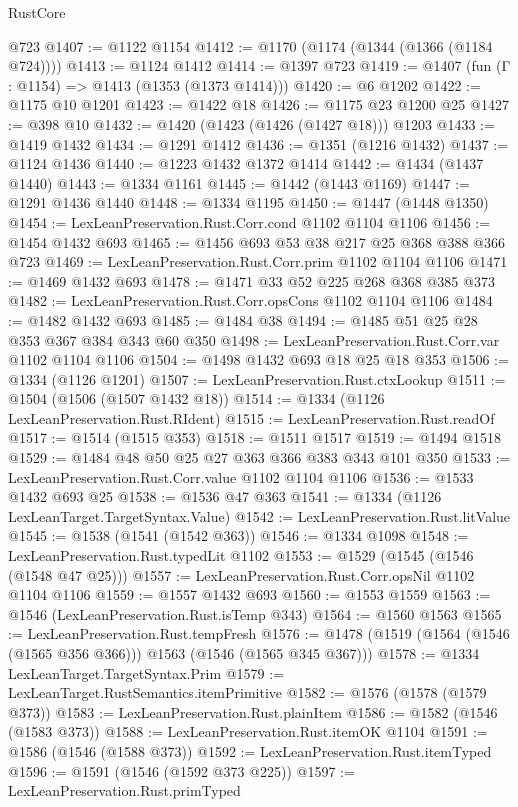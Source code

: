 \begin{lexlean}{RustCore}
\begin{coremodule}
    @723
@1407 := @1122 @1154
@1412 := @1170 (@1174 (@1344 (@1366 (@1184 @724))))
@1413 := @1124 @1412
@1414 := @1397 @723
@1419 := @1407 (fun (Γ : @1154) => @1413 (@1353 (@1373 @1414)))
@1420 := @6 @1202
@1422 := @1175 @10 @1201
@1423 := @1422 @18
@1426 := @1175 @23 @1200 @25
@1427 := @398 @10
@1432 := @1420 (@1423 (@1426 (@1427 @18))) @1203
@1433 := @1419 @1432
@1434 := @1291 @1412
@1436 := @1351 (@1216 @1432)
@1437 := @1124 @1436
@1440 := @1223 @1432 @1372 @1414
@1442 := @1434 (@1437 @1440)
@1443 := @1334 @1161
@1445 := @1442 (@1443 @1169)
@1447 := @1291 @1436 @1440
@1448 := @1334 @1195
@1450 := @1447 (@1448 @1350)
@1454 := LexLeanPreservation.Rust.Corr.cond @1102 @1104 @1106
@1456 := @1454 @1432 @693
@1465 := @1456 @693 @53 @38 @217 @25 @368 @388 @366 @723
@1469 := LexLeanPreservation.Rust.Corr.prim @1102 @1104 @1106
@1471 := @1469 @1432 @693
@1478 := @1471 @33 @52 @225 @268 @368 @385 @373
@1482 := LexLeanPreservation.Rust.Corr.opsCons @1102 @1104 @1106
@1484 := @1482 @1432 @693
@1485 := @1484 @38
@1494 := @1485 @51 @25 @28 @353 @367 @384 @343 @60 @350
@1498 := LexLeanPreservation.Rust.Corr.var @1102 @1104 @1106
@1504 := @1498 @1432 @693 @18 @25 @18 @353
@1506 := @1334 (@1126 @1201)
@1507 := LexLeanPreservation.Rust.ctxLookup
@1511 := @1504 (@1506 (@1507 @1432 @18))
@1514 := @1334 (@1126 LexLeanPreservation.Rust.RIdent)
@1515 := LexLeanPreservation.Rust.readOf
@1517 := @1514 (@1515 @353)
@1518 := @1511 @1517
@1519 := @1494 @1518
@1529 := @1484 @48 @50 @25 @27 @363 @366 @383 @343 @101 @350
@1533 := LexLeanPreservation.Rust.Corr.value @1102 @1104 @1106
@1536 := @1533 @1432 @693 @25
@1538 := @1536 @47 @363
@1541 := @1334 (@1126 LexLeanTarget.TargetSyntax.Value)
@1542 := LexLeanPreservation.Rust.litValue
@1545 := @1538 (@1541 (@1542 @363))
@1546 := @1334 @1098
@1548 := LexLeanPreservation.Rust.typedLit @1102
@1553 := @1529 (@1545 (@1546 (@1548 @47 @25)))
@1557 := LexLeanPreservation.Rust.Corr.opsNil @1102 @1104 @1106
@1559 := @1557 @1432 @693
@1560 := @1553 @1559
@1563 := @1546 (LexLeanPreservation.Rust.isTemp @343)
@1564 := @1560 @1563
@1565 := LexLeanPreservation.Rust.tempFresh
@1576 := @1478 (@1519 (@1564 (@1546 (@1565 @356 @366))) @1563 (@1546 (@1565 @345 @367)))
@1578 := @1334 LexLeanTarget.TargetSyntax.Prim
@1579 := LexLeanTarget.RustSemantics.itemPrimitive
@1582 := @1576 (@1578 (@1579 @373))
@1583 := LexLeanPreservation.Rust.plainItem
@1586 := @1582 (@1546 (@1583 @373))
@1588 := LexLeanPreservation.Rust.itemOK @1104
@1591 := @1586 (@1546 (@1588 @373))
@1592 := LexLeanPreservation.Rust.itemTyped
@1596 := @1591 (@1546 (@1592 @373 @225))
@1597 := LexLeanPreservation.Rust.primTyped

\end{coremodule}
\end{lexlean}
